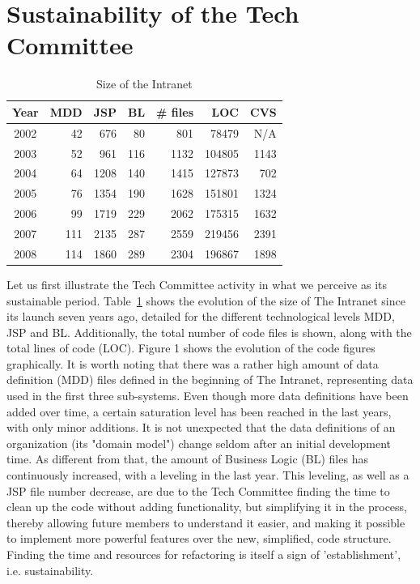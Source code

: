 \documentclass{sig-alt-release2}
\begin{document}
\section{Sustainability of the Tech Committee}\label{sec:techCommittee}
\begin{table}
	\centering
	\begin{tabular}{c|r|r|r|r|r|r}
		\hline
		\hline
		Year	& MDD	& JSP	& BL	& \# files	& LOC		& CVS	 \\
		\hline
		\hline
		2002 	& 42	& 676	& 80	& 801		& 78479 	& N/A	 \\ 
		\hline
		2003 	& 52	& 961	& 116	& 1132		& 104805 	& 1143	 \\ 
		\hline
		2004 	& 64	& 1208	& 140	& 1415		& 127873 	& 702	 \\ 
		\hline
		2005 	& 76	& 1354	& 190	& 1628		& 151801 	& 1324	 \\ 
		\hline
		2006 	& 99	& 1719	& 229	& 2062		& 175315 	& 1632	 \\ 
		\hline
		2007 	& 111	& 2135	& 287	& 2559		& 219456 	& 2391	 \\ 
		\hline
		2008 	& 114	& 1860	& 289	& 2304		& 196867 	& 1898	 \\ 
		\hline
		
		\hline
		\hline
	\end{tabular}
	\caption{Size of the Intranet}
	\label{tab:intranet-size}
\end{table} 

Let us first illustrate the Tech Committee activity in what we perceive as its sustainable period. Table~\ref{tab:intranet-size} shows the evolution of the size of The Intranet since its launch seven years ago, detailed for the different technological levels MDD, JSP and BL. Additionally, the total number of code files is shown, along with the total lines of code (LOC).  Figure 1 shows the evolution of the code figures graphically. It is worth noting that there was a rather high amount of data definition (MDD) files defined in the beginning of The Intranet, representing data used in the first three sub-systems. Even though more data definitions have been added over time, a certain saturation level has been reached in the last years, with only minor additions. It is not unexpected that the data definitions of an organization (its "domain model") change seldom after an initial development time. 
As different from that, the amount of Business Logic (BL) files has continuously increased, with a leveling in the last year.
This leveling, as well as a JSP file number decrease, are due to the Tech Committee finding the time to clean up the code without adding functionality, but simplifying it in the process, thereby allowing future members to understand it easier, and making it possible to implement more powerful features over the new, simplified, code structure. Finding the time and resources for refactoring is itself a sign of 'establishment', i.e. sustainability.
\end{document}
